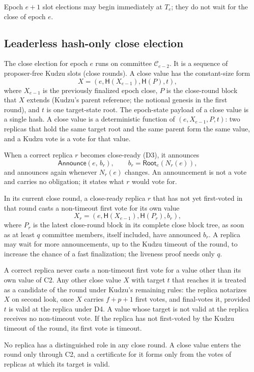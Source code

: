 \documentclass[11pt]{article}
\theoremstyle{remark}
\newcommand{\C}{\mathcal{C}}
\newcommand{\hash}{\mathsf{H}}
\newcommand{\Root}{\mathsf{Root}}
\newcommand{\Announce}{\mathsf{Announce}}
\begin{document}
Epoch $e+1$ slot elections may begin immediately at $T_e$; they do not wait for the close of epoch $e$.

\subsection{Leaderless hash-only close election}
\label{subsec:close}

The close election for epoch $e$ runs on committee $\C_{e-2}$. It is a sequence of proposer-free Kudzu slots (close rounds). A close value has the constant-size form
\begin{equation}
  X=(e,\hash(X_{e-1}),\hash(P),t),
  \label{eq:close-block}
\end{equation}
where $X_{e-1}$ is the previously finalized epoch close, $P$ is the close-round block that $X$ extends (Kudzu's parent reference; the notional genesis in the first round), and $t$ is one target-state root. The epoch-state payload of a close value is a single hash. A close value is a deterministic function of $(e,X_{e-1},P,t)$: two replicas that hold the same target root and the same parent form the same value, and a Kudzu vote is a vote for that value.

\begin{description}[leftmargin=2.4em,labelindent=0em]
\item[C1 (announcement).]
When a correct replica $r$ becomes close-ready (D3), it announces
\[
  \Announce(e,\,b_r),
  \qquad b_r=\Root_e(N_r(e)),
\]
and announces again whenever $N_r(e)$ changes. An announcement is not a vote and carries no obligation; it states what $r$ would vote for.

\item[C2 (own value).]
In its current close round, a close-ready replica $r$ that has not yet first-voted in that round casts a non-timeout first vote for its own value
\[
  X_r=(e,\hash(X_{e-1}),\hash(P_r),b_r),
\]
where $P_r$ is the latest close-round block in its complete close block tree, as soon as at least $q$ committee members, itself included, have announced $b_r$. A replica may wait for more announcements, up to the Kudzu timeout of the round, to increase the chance of a fast finalization; the liveness proof needs only $q$.

\item[C3 (following through the second look).]
A correct replica never casts a non-timeout first vote for a value other than its own value of C2. Any other close value $X$ with target $t$ that reaches it is treated as a candidate of the round under Kudzu's remaining rules: the replica notarizes $X$ on second look, once $X$ carries $f+p+1$ first votes, and final-votes it, provided $t$ is valid at the replica under D4. A value whose target is not valid at the replica receives no non-timeout vote. If the replica has not first-voted by the Kudzu timeout of the round, its first vote is timeout.

\item[C4 (no proposer).]
No replica has a distinguished role in any close round. A close value enters the round only through C2, and a certificate for it forms only from the votes of replicas at which its target is valid.
\end{description}
\end{document}
